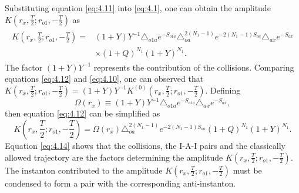 \documentclass[12pt]{article}
\begin{document}
Substituting equation \eqref{eq:4.11} into \eqref{eq:4.1}, one can obtain the amplitude $K(r_{x},\frac{T}{2}; r_{o1}, -\frac{T}{2})$ as
\begin{eqnarray}\begin{split}
\label{eq:4.12}%
K(r_{x},\frac{T}{2}; r_{o1}, -\frac{T}{2})=&(1+Y)Y^{-1}\triangle_{o1a}e^{-S_{o1a}}\triangle_{oa}^{2(N_{1}-1)}e^{-2(N_{1}-1)S_{oa}}\triangle_{ax}e^{-S_{ax}}\\&\times(1+Q)^{N_{1}}(1+Y)^{N_{1}}.
\end{split}
\end{eqnarray}
The factor $(1+Y)Y^{-1}$ represents the contribution of the collisions. Comparing equations \eqref{eq:4.12} and \eqref{eq:4.10}, one can observed that $K(r_{x},\frac{T}{2}; r_{o1}, -\frac{T}{2})=(1+Y)Y^{-1}K^{(0)}(r_{x},\frac{T}{2}; r_{o1}, -\frac{T}{2})$.  Defining
\begin{equation}
\label{eq:4.13}%
\Omega(r_{x})\equiv (1+Y)Y^{-1}\triangle_{o1a}e^{-S_{o1a}}\triangle_{ax}e^{-S_{ax}},
\end{equation}
then equation \eqref{eq:4.12} can be simplified as
\begin{equation}
\label{eq:4.14}%
K(r_{x},\frac{T}{2}; r_{o1}, -\frac{T}{2})=\Omega(r_{x})\triangle_{oa}^{2(N_{1}-1)}e^{-2(N_{1}-1)S_{oa}}(1+Q)^{N_{1}}(1+Y)^{N_{1}}.
\end{equation}
Equation \eqref{eq:4.14} shows that the collisions, the I-A-I pairs and the classically allowed trajectory are the factors determining the amplitude $K(r_{x},\frac{T}{2}; r_{o1}, -\frac{T}{2})$. The instanton contributed to the amplitude $K(r_{x},\frac{T}{2}; r_{o1}, -\frac{T}{2})$ must be condensed to form a pair with the corresponding anti-instanton.
\end{document}
